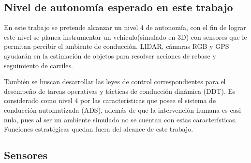 \subsection{Nivel de autonomía esperado en este trabajo} \label{sub:nivel_de_autonomía_esperado_en_este_trabajo}

En este trabajo se pretende alcanzar un nivel 4 de autonomía, con el fin de lograr este nivel se planea instrumentar un vehículo(simulado en 3D) con sensores que le permitan percibir el ambiente de conducción. LIDAR, cámaras RGB y GPS ayudarán en la estimación de objetos para resolver acciones de rebase y seguimiento de carriles.

También se buscan desarrollar las leyes de control correspondientes para el desempeño de tareas operativas y tácticas de conducción dinámica (DDT). Es considerado como nivel 4 por las características que posee el sistema de conducción automatizada (ADS), además de que la intervención humana es casi nula, pues al ser un ambiente simulado no se cuentan con estas características. Funciones estratégicas quedan fuera del alcance de este trabajo.

\subsection{Sensores} \label{sub:sensores}

